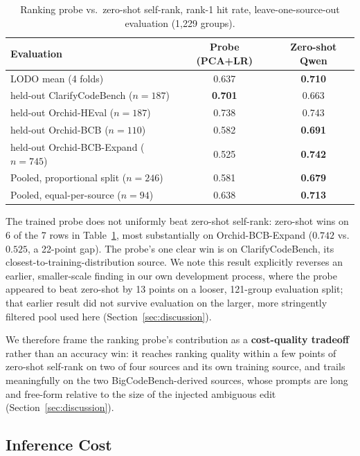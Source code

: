 \begin{table}[htbp]
\caption{Ranking probe vs.\ zero-shot self-rank, rank-1 hit rate, leave-one-source-out evaluation (1,229 groups).}
\label{tab:ranking}
\centering
\begin{tabular}{lcc}
\toprule
Evaluation & Probe (PCA+LR) & Zero-shot Qwen \\
\midrule
LODO mean (4 folds) & 0.637 & \textbf{0.710} \\
\quad held-out ClarifyCodeBench ($n{=}187$) & \textbf{0.701} & 0.663 \\
\quad held-out Orchid-HEval ($n{=}187$) & 0.738 & 0.743 \\
\quad held-out Orchid-BCB ($n{=}110$) & 0.582 & \textbf{0.691} \\
\quad held-out Orchid-BCB-Expand ($n{=}745$) & 0.525 & \textbf{0.742} \\
Pooled, proportional split ($n{=}246$) & 0.581 & \textbf{0.679} \\
Pooled, equal-per-source ($n{=}94$) & 0.638 & \textbf{0.713} \\
\bottomrule
\end{tabular}
\end{table}

The trained probe does not uniformly beat zero-shot self-rank: zero-shot
wins on 6 of the 7 rows in Table~\ref{tab:ranking}, most substantially on
Orchid-BCB-Expand ($0.742$ vs.\ $0.525$, a 22-point gap). The probe's one
clear win is on ClarifyCodeBench, its closest-to-training-distribution
source. We note this result explicitly reverses an earlier, smaller-scale
finding in our own development process, where the probe appeared to beat
zero-shot by 13 points on a looser, 121-group evaluation split; that
earlier result did not survive evaluation on the larger, more stringently
filtered pool used here (Section~\ref{sec:discussion}).

We therefore frame the ranking probe's contribution as a
\textbf{cost-quality tradeoff} rather than an accuracy win: it reaches
ranking quality within a few points of zero-shot self-rank on two of four
sources and its own training source, and trails meaningfully on the two
BigCodeBench-derived sources, whose prompts are long and free-form relative
to the size of the injected ambiguous edit (Section~\ref{sec:discussion}).

\subsection{Inference Cost}
\label{sec:results:cost}

